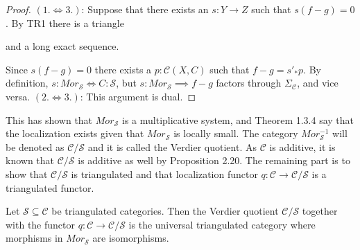     \begin{proof}
        $(1.\iff 3.)$:
        Suppose that there exists an $s:Y\rightarrow Z$ such that $s(f-g)=0$. By TR1 there is a triangle  and a long exact sequence.
        \begin{center}
        \end{center}
        Since $s(f-g)=0$ there exists a $p:\mathcal{C}(X,C)$ such that $f-g = s'_*p$. By definition, $s:Mor_\mathcal{S}\iff C:\mathcal{S}$, but $s:Mor_\mathcal{S}\implies f-g$ factors through $\Sigma_{\mathcal{C}}$, and vice versa.
        $(2.\iff 3.)$:
        This argument is dual.
    \end{proof}

    This has shown that $Mor_\mathcal{S}$ is a multiplicative system, and Theorem 1.3.4 say that the localization exists given that $Mor_\mathcal{S}$ is locally small. The category $Mor_\mathcal{S}^{-1}$ will be denoted as $\mathcal{C}/\mathcal{S}$ and it is called the Verdier quotient. As $\mathcal{C}$ is additive, it is known that $\mathcal{C}/\mathcal{S}$ is additive as well by Proposition 2.20. The remaining part is to show that $\mathcal{C}/\mathcal{S}$ is triangulated and that localization functor $q:\mathcal{C}\rightarrow \mathcal{C}/\mathcal{S}$ is a triangulated functor.

    \begin{theorem}
        Let $\mathcal{S}\subseteq\mathcal{C}$ be triangulated categories. Then the Verdier quotient $\mathcal{C}/\mathcal{S}$ together with the functor $q:\mathcal{C}\rightarrow\mathcal{C}/\mathcal{S}$ is the universal triangulated category where morphisms in $Mor_\mathcal{S}$ are isomorphisms.
    \end{theorem}

